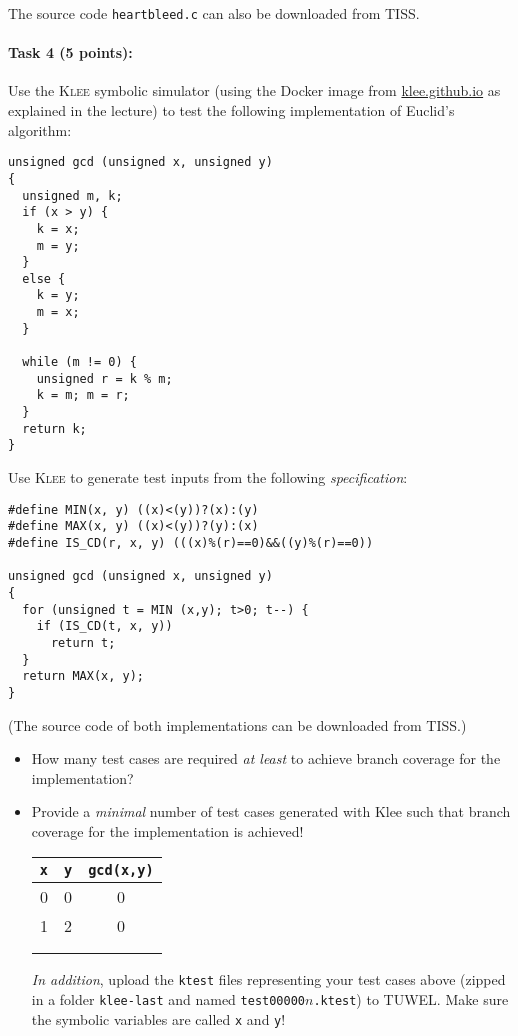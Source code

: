 \documentclass[11pt,a4paper]{article}
\begin{document}
\vfill
The source code {\tt heartbleed.c} can also be downloaded from TISS.
\vfill

\clearpage

\paragraph{Task 4 (5 points):}
Use the \textsc{Klee} symbolic simulator (using the Docker image
from \url{klee.github.io} as explained in the lecture) to test
the following implementation of Euclid's algorithm:

\noindent
\begin{lstlisting}
unsigned gcd (unsigned x, unsigned y)
{
  unsigned m, k;
  if (x > y) {
    k = x;
    m = y;
  }
  else {
    k = y;
    m = x;
  }

  while (m != 0) {
    unsigned r = k % m;
    k = m; m = r;
  }
  return k;
}
\end{lstlisting}

Use \textsc{Klee} to generate test inputs from the following
\emph{specification}:

\noindent
\begin{lstlisting}
#define MIN(x, y) ((x)<(y))?(x):(y)
#define MAX(x, y) ((x)<(y))?(y):(x)
#define IS_CD(r, x, y) (((x)%(r)==0)&&((y)%(r)==0))

unsigned gcd (unsigned x, unsigned y)
{
  for (unsigned t = MIN (x,y); t>0; t--) {
    if (IS_CD(t, x, y))
      return t;
  }
  return MAX(x, y);
}
\end{lstlisting}

(The source code of both implementations can be downloaded from TISS.)

\begin{itemize}
\item How many test cases are required \emph{at least} to
  achieve branch coverage for the implementation?
\item Provide a \emph{minimal} number of test cases generated
  with {\sc Klee} such that branch coverage for the implementation
  is achieved!
  \begin{center}
    \begin{tabular}{|c|c||c|}
      \hline
      {\tt x} & {\tt y} & {\tt gcd(x,y)} \\
      \hline
      0 & 0 & 0 \\
      1 & 2 & 0 \\
      & &\\[7ex] \\
    \end{tabular}
  \end{center}
  \vfill
  \emph{In addition}, upload the {\tt ktest} files representing
  your test cases above (zipped in a folder {\tt klee-last} and
  named {\tt test00000$n$.ktest}) to TUWEL. Make sure the
  symbolic variables are called {\tt x} and {\tt y}!
\end{itemize}
\end{document}
